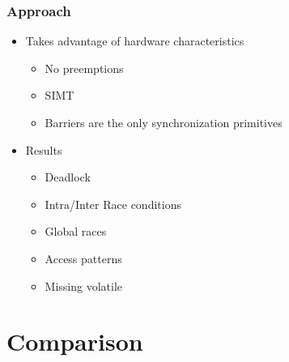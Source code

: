 \documentclass{beamer}
\begin{document}
	\begin{frame}
		\frametitle{Approach}
		\begin{itemize}
			\item Takes advantage of hardware characteristics
			\begin{itemize}
				\item No preemptions
				\item SIMT
				\item Barriers are the only synchronization primitives
			\end{itemize}
			\item Results
			\begin{itemize}
				\item Deadlock
				\item Intra/Inter Race conditions
				\item Global races
				\item Access patterns
				\item Missing volatile
			\end{itemize}
		\end{itemize}
	\end{frame}
	
	
	\section{Comparison}
	
\end{document}
